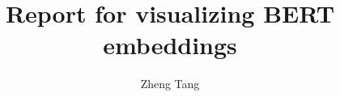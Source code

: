 \documentclass[11pt, twocolumn]{article}
\begin{document}
\title{Report for visualizing BERT embeddings}

\author{Zheng Tang}

\maketitle










\end{document}
